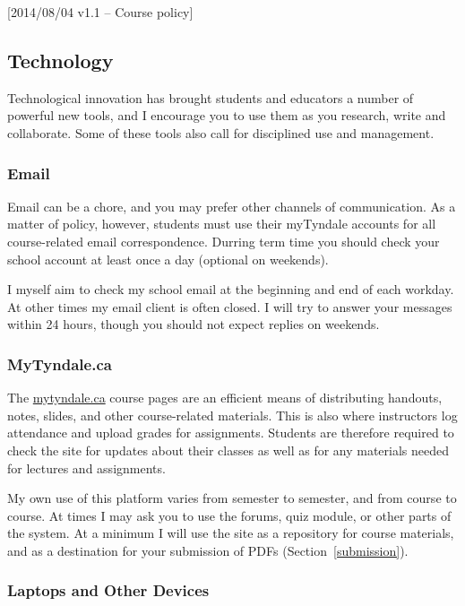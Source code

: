 [2014/08/04 v1.1 -- Course policy]

\subsection{Technology}
\label{technology}

Technological innovation has brought students and educators a number of
powerful new tools, and I encourage you to use them as you research, write and
collaborate. Some of these tools also call for disciplined use and management.

\subsubsection{Email}
\label{email}

Email can be a chore, and you may prefer other channels of communication. As a
matter of policy, however, students must use their myTyndale accounts for all
course-related email correspondence. Durring term time you should check your
school account at least once a day (optional on weekends).

I myself aim to check my school email at the beginning and end of each workday.
At other times my email client is often closed. I will try to answer your
messages within 24 hours, though you should not expect replies on weekends.

\subsubsection{MyTyndale.ca}
\label{mytyndale}

The \href{http://mytyndale.ca}{mytyndale.ca} course pages are an efficient
means of distributing handouts, notes, slides, and other course-related
materials. This is also where instructors log attendance and upload grades for
assignments. Students are therefore required to check the site for updates
about their classes as well as for any materials needed for lectures and
assignments.

My own use of this platform varies from semester to semester, and from
course to course. At times I may ask you to use the forums, quiz module, or
other parts of the system. At a minimum I will use the site as a repository
for course materials, and as a destination for your submission of PDFs
(Section~\ref{submission}).

\subsubsection{Laptops and Other Devices}
\label{laptops}


